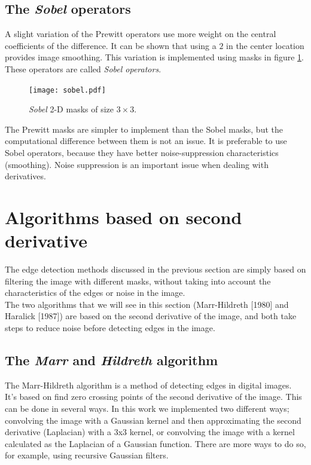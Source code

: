 \documentclass{ipol}
\numberwithin{equation}{section}
\numberwithin{table}{section}
\numberwithin{figure}{section}
\begin{document}
\subsection{The \textit{Sobel} operators}

A slight variation of the Prewitt operators use more weight on the central coefficients of the 
difference. It can be shown that using a $2$ in the center location provides image smoothing. This
variation is implemented using masks in figure \ref{fig:sobel}. These operators are called 
\textit{Sobel operators}.\\

\begin{figure}
	\centering
	\texttt{[image: sobel.pdf]}
	\caption{\textit{Sobel} 2-D masks of size $3\times3$.}
	\label{fig:sobel}
\end{figure}

The Prewitt masks are simpler to implement than the Sobel masks, but the computational difference
between them is not an issue. It is preferable to use Sobel operators, because they have better
noise-suppression characteristics (smoothing). Noise suppression is an important issue when dealing
with derivatives.\\

\section{Algorithms based on second derivative}
\label{sec:second}

The edge detection methods discussed in the previous section are simply based on filtering the 
image with different masks, without taking into account the characteristics of the edges or 
noise in the image.\\

The two algorithms that we will see in this section (Marr-Hildreth [1980] and Haralick [1987]) 
are based on the second derivative of the image, and both take steps to reduce noise before 
detecting edges in the image.\\

\subsection{The \textit{Marr} and \textit{Hildreth} algorithm}

The Marr-Hildreth algorithm is a method of detecting edges in digital 
images. It's based on find zero crossing points of the second derivative
of the image. This can be done in several ways. In this work we implemented 
two different ways; convolving the image with a Gaussian kernel and then 
approximating the second derivative (Laplacian) with a 3x3 kernel, or 
convolving the image with a kernel calculated as the Laplacian of a 
Gaussian function. There are more ways to do so, for example, using 
recursive Gaussian filters.\\ %
\end{document}
